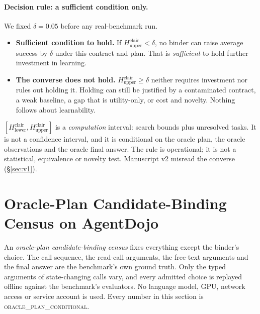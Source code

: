 \documentclass{article}
\begin{document}
\paragraph{Decision rule: a sufficient condition only.}
We fixed $\delta=0.05$ before any real-benchmark run.
\begin{itemize}
\item \textbf{Sufficient condition to hold.} If
$H^{\mathrm{clair}}_{\mathrm{upper}}<\delta$, no binder can raise average
success by $\delta$ under this contract and plan. That is \emph{sufficient}
to hold further investment in learning.
\item \textbf{The converse does not hold.} $H^{\mathrm{clair}}_{\mathrm{upper}}\ge\delta$
neither requires investment nor rules out holding it. Holding can still be
justified by a contaminated contract, a weak baseline, a gap that is
utility-only, or cost and novelty. Nothing follows about learnability.
\end{itemize}
$[H^{\mathrm{clair}}_{\mathrm{lower}},H^{\mathrm{clair}}_{\mathrm{upper}}]$
is a \emph{computation} interval: search bounds plus unresolved tasks. It is
not a confidence interval, and it is conditional on the oracle plan, the
oracle observations and the oracle final answer. The rule is operational; it
is not a statistical, equivalence or novelty test. Manuscript v2 misread the
converse (\S\ref{sec:v1}).

\section{Oracle-Plan Candidate-Binding Census on AgentDojo}
\label{sec:exp-real}

An \emph{oracle-plan candidate-binding census} fixes everything except the
binder's choice. The call sequence, the read-call arguments, the free-text
arguments and the final answer are the benchmark's own ground truth. Only
the typed arguments of state-changing calls vary, and every admitted choice
is replayed offline against the benchmark's evaluators. No language model,
GPU, network access or service account is used. Every number in this
section is \textsc{oracle\_plan\_conditional}.
\end{document}
